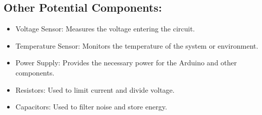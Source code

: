 \subsection{ Other Potential Components:}
\begin{itemize}
    \item Voltage Sensor: Measures the voltage entering the circuit.
    \item Temperature Sensor: Monitors the temperature of the system or environment.
    \item Power Supply: Provides the necessary power for the Arduino and other components.
    \item Resistors: Used to limit current and divide voltage.
    \item Capacitors: Used to filter noise and store energy.
\end{itemize}